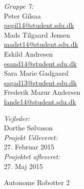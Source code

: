 \begin{titlepage}
\begin{center}
\begin{minipage}{0.50\textwidth}
\begin{flushleft}\large
\emph{Gruppe 7:}\\
\vspace{4mm}
Peter Gilsaa \\
\href{mailto:pegil14@student.sdu.dk}{\color{sdu_blue}pegil14@student.sdu.dk}\\
\vspace{4mm}
Mads Tilgaard Jensen\\
\href{mailto:madst14@student.sdu.dk}{\color{sdu_blue}madst14@student.sdu.dk}\\
\vspace{4mm}
Eskild Andresen\\
\href{mailto:esand14@student.sdu.dk}{\color{sdu_blue}esand14@student.sdu.dk}\\
\vspace{4mm}
Sara Marie Gadgaard\\
\href{mailto:sagad13@student.sdu.dk}{\color{sdu_blue}sagad13@student.sdu.dk}\\
\vspace{4mm}
Frederik Mazur Andersen\\
\href{mailto:fande14@student.sdu.dk}{\color{sdu_blue}fande14@student.sdu.dk}\\
\end{flushleft}
\end{minipage}
\begin{minipage}[c][2cm]{0.45\textwidth}
\begin{flushright} \large
\vspace{2cm}
\emph{Vejleder:} \\
Dorthe Sølvason  \\
\vspace{2cm}
\emph{Projekt Udleveret:} \\
27. Februar 2015 \\
\emph{Projektet afleveret:} \\
27. Maj 2015
\end{flushright}
\end{minipage}

\vfill

{\Large Autonome Robotter 2}
\end{center}
\end{titlepage}
